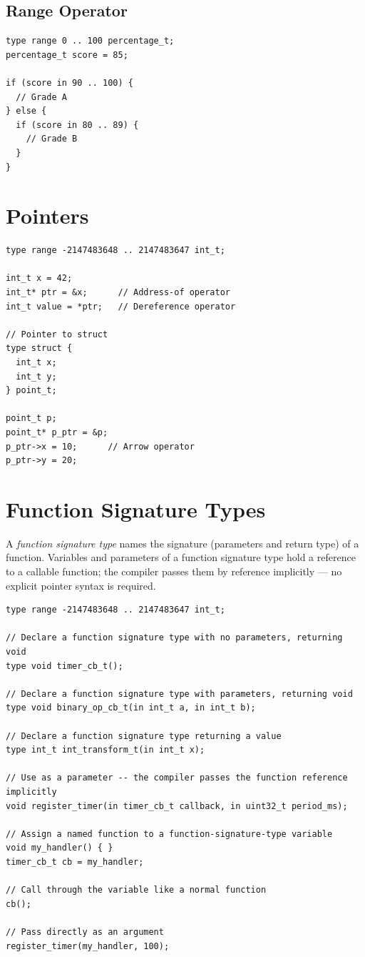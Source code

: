 \documentclass[11pt,letterpaper,twoside,openany]{book}
\begin{document}
\subsection{Range Operator}
\begin{lstlisting}
type range 0 .. 100 percentage_t;
percentage_t score = 85;

if (score in 90 .. 100) {
  // Grade A
} else {
  if (score in 80 .. 89) {
    // Grade B
  }
}
\end{lstlisting}

\section{Pointers}
\begin{lstlisting}
type range -2147483648 .. 2147483647 int_t;

int_t x = 42;
int_t* ptr = &x;      // Address-of operator
int_t value = *ptr;   // Dereference operator

// Pointer to struct
type struct {
  int_t x;
  int_t y;
} point_t;

point_t p;
point_t* p_ptr = &p;
p_ptr->x = 10;      // Arrow operator
p_ptr->y = 20;
\end{lstlisting}

\section{Function Signature Types}

A \emph{function signature type} names the signature (parameters and return type) of a
function. Variables and parameters of a function signature type hold a reference to a
callable function; the compiler passes them by reference implicitly --- no explicit
pointer syntax is required.

\begin{lstlisting}
type range -2147483648 .. 2147483647 int_t;

// Declare a function signature type with no parameters, returning void
type void timer_cb_t();

// Declare a function signature type with parameters, returning void
type void binary_op_cb_t(in int_t a, in int_t b);

// Declare a function signature type returning a value
type int_t int_transform_t(in int_t x);

// Use as a parameter -- the compiler passes the function reference implicitly
void register_timer(in timer_cb_t callback, in uint32_t period_ms);

// Assign a named function to a function-signature-type variable
void my_handler() { }
timer_cb_t cb = my_handler;

// Call through the variable like a normal function
cb();

// Pass directly as an argument
register_timer(my_handler, 100);
\end{lstlisting}
\end{document}
